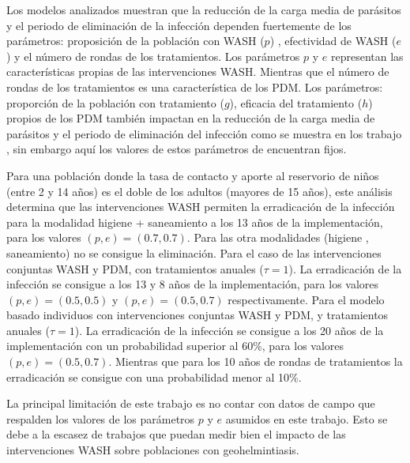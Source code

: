 \documentclass[12pt,a4paper]{article}
\theoremstyle{plain}%
\theoremstyle{definition}
\theoremstyle{remark}
\begin{document}
	Los modelos analizados muestran que la reducción de la carga media de parásitos y el periodo de eliminación de la infección dependen fuertemente de los parámetros:  proposición de la población con WASH ($p$) , efectividad de WASH ($e$) y el número de rondas de los tratamientos. Los parámetros $p$ y $e$ representan las características propias de las intervenciones WASH. 
	Mientras que el número de rondas de los tratamientos es una característica de los PDM. Los parámetros: proporción de la población con tratamiento ($g$), eficacia del tratamiento ($h$) propios de los PDM también impactan en la reducción de la carga media de parásitos y el periodo de eliminación del infección como se muestra en los trabajo \cite{anderson2014coverage,truscott2014modeling}, sin embargo aquí los valores de estos parámetros de encuentran fijos.     
	
  
	Para una población %
	donde la tasa de contacto y aporte al reservorio de niños (entre 2 y 14 años) es el doble de los adultos (mayores de 15 años), este análisis determina que   
	las intervenciones WASH permiten la erradicación de la infección para la modalidad  higiene + saneamiento a los 13 años de la implementación, para los valores $(p,e)=(0.7,0.7)$. Para las otra modalidades (higiene , saneamiento) no se consigue la eliminación. Para el caso de las intervenciones conjuntas WASH y PDM, con tratamientos anuales ($\tau=1$). La erradicación de la infección se consigue a los 13 y 8 años de la implementación, para los valores $(p,e)=(0.5,0.5)$ y $(p,e)=(0.5,0.7)$  respectivamente. 
	Para el modelo basado individuos con intervenciones conjuntas WASH y PDM, y tratamientos anuales ($\tau=1$). 
	La erradicación de la infección se consigue a los 20 años de la implementación con un probabilidad superior al 60\%, para los valores $(p,e)=(0.5,0.7)$. Mientras que para los 10 años de rondas de tratamientos la erradicación se consigue con una probabilidad menor al 10\%.
	
	La principal limitación de este trabajo es no contar con datos de campo que respalden los valores de los parámetros $p$ y $e$ asumidos en este trabajo. Esto se debe a la escasez de trabajos que puedan medir bien el impacto de las intervenciones WASH sobre poblaciones con geohelmintiasis. 
	
\end{document}
